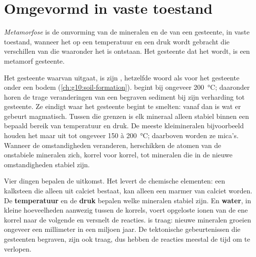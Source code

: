 \section{Omgevormd in vaste toestand}

\begin{definition}[Metamorfose]\label{def:g12:metamorphic-rocks:metamorphism}
\emph{Metamorfose} is de omvorming van de
mineralen en de  van een gesteente, in vaste toestand, wanneer het op
een temperatuur en een druk wordt gebracht die verschillen van die waaronder het is ontstaan.
Het gesteente dat het wordt, is een metamorf gesteente.
\end{definition}

Het gesteente waarvan  uitgaat, is zijn , hetzelfde woord als
voor het gesteente onder een bodem (\cref{ch:g10:soil-formation}).  begint bij ongeveer \qty{200}{\celsius}; daaronder horen de trage
veranderingen van een begraven sediment bij zijn verharding tot gesteente. Ze eindigt
waar het gesteente begint te smelten: vanaf dan is wat er gebeurt magmatisch. Tussen
die grenzen is elk mineraal alleen stabiel binnen een bepaald bereik van
temperatuur en druk. De meeste kleimineralen bijvoorbeeld houden het maar uit tot
ongeveer 150 à \qty{200}{\celsius}; daarboven worden ze mica's. Wanneer de
omstandigheden veranderen, herschikken de atomen van de onstabiele mineralen zich,
korrel voor korrel, tot mineralen die in de nieuwe omstandigheden stabiel zijn.

Vier dingen bepalen de uitkomst. Het \textbf{} levert de
chemische elementen: een kalksteen die alleen uit calciet bestaat, kan alleen een
marmer van calciet worden. De \textbf{temperatuur} en de \textbf{druk} bepalen welke
mineralen stabiel zijn. En \textbf{water}, in kleine hoeveelheden aanwezig tussen
de korrels, voert opgeloste ionen van de ene korrel naar de volgende en versnelt
de reacties.  is traag: nieuwe mineralen groeien ongeveer een millimeter
in een miljoen jaar. De tektonische gebeurtenissen die gesteenten begraven, zijn ook traag, dus
hebben de reacties meestal de tijd om te verlopen.

